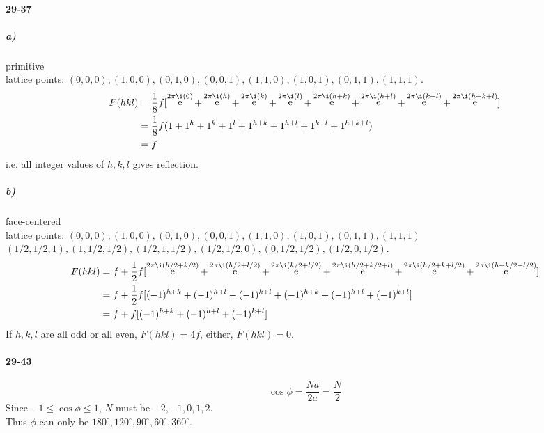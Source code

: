 \documentclass[a4paper]{article}
\DeclareMathOperator{\e}{\mathrm{e}}
\newcommand{\ex}[1]{\paragraph{29-#1}}
\newcommand{\subex}[1]{\subparagraph{#1}}
\numberwithin{equation}{section}
\begin{document}
\ex{37}
\subex{a)} primitive\\
lattice points: $ (0,0,0), (1,0,0), (0,1,0), (0,0,1), (1,1,0), (1,0,1), (0,1,1), (1,1,1) $.
\begin{align}
F(hkl) &= \dfrac{1}{8}f[\e^{2\pi\i(0)} + \e^{2\pi\i(h)} + \e^{2\pi\i(k)} + \e^{2\pi\i(l)} + \e^{2\pi\i(h+k)} + \e^{2\pi\i(h+l)} + \e^{2\pi\i(k+l)} + \e^{2\pi\i(h+k+l)}]  \notag\\
&= \dfrac{1}{8}f(1 + 1^h + 1^k + 1^l + 1^{h+k} + 1^{h+l} + 1^{k+l} + 1^{h+k+l}) \notag\\
&= f
\end{align}
i.e. all integer values of $ h,k,l $ gives reflection.
\subex{b)} face-centered\\
lattice points: $ (0,0,0), (1,0,0), (0,1,0), (0,0,1), (1,1,0), (1,0,1), (0,1,1), (1,1,1) $\\
$ (1/2,1/2,1), (1,1/2,1/2), (1/2,1,1/2), (1/2,1/2,0), (0,1/2,1/2), (1/2,0,1/2) $.
\begin{align}
F(hkl) &= f + \dfrac{1}{2}f[\e^{2\pi\i(h/2+k/2)} + \e^{2\pi\i(h/2+l/2)} + \e^{2\pi\i(k/2+l/2)} + \e^{2\pi\i(h/2+k/2+l)} + \e^{2\pi\i(h/2+k+l/2)} + \e^{2\pi\i(h+k/2+l/2)}]  \notag\\
&= f + \dfrac{1}{2}f[(-1)^{h+k} + (-1)^{h+l} + (-1)^{k+l} + (-1)^{h+k} + (-1)^{h+l} + (-1)^{k+l}] \notag\\
&= f + f[(-1)^{h+k} + (-1)^{h+l} + (-1)^{k+l}]
\end{align}
If $ h,k,l $ are all odd or all even, $ F(hkl) = 4f $, either, $ F(hkl) = 0 $.





\ex{43}
\begin{equation}\label{key}
\cos\phi = \dfrac{N a}{2a} = \dfrac{N}{2}
\end{equation}
Since $ -1 \leq \cos\phi \leq 1 $, $ N $ must be $ -2, -1, 0, 1, 2 $.\\
Thus $ \phi $ can only be $ 180^\circ, 120^\circ, 90^\circ, 60^\circ, 360^\circ $.

\newpage
~\\
\newpage
~\\

\newpage
~\\
\end{document}
